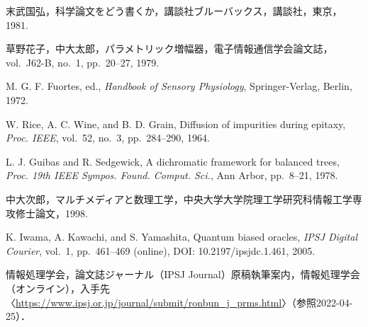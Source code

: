 \documentclass[10pt,a4paper,notitlepage,oneside,twocolumn]{abst_jsarticle}
\begin{document}
\begin{thebibliography}{99}

末武国弘，科学論文をどう書くか，講談社ブルーバックス，講談社，東京，1981. 

草野花子，中大太郎，パラメトリック増幅器，電子情報通信学会論文誌，vol.~J62-B, no.~1, pp.~20--27, 1979. 

M. G. F. Fuortes, ed., \textit{Handbook of Sensory Physiology}, Springer-Verlag, Berlin, 1972.

W. Rice, A. C. Wine, and B. D. Grain, Diffusion of impurities during epitaxy, \textit{Proc. IEEE}, vol.~52, no.~3, pp.~284--290, 1964.

L. J. Guibas and R. Sedgewick, A dichromatic framework for balanced trees, 
\textit{Proc. 19th IEEE Sympos. Found. Comput. Sci.}, Ann Arbor, pp.~8--21, 1978.

中大次郎，マルチメディアと数理工学，中央大学大学院理工学研究科情報工学専攻修士論文，1998.

K. Iwama, A. Kawachi, and S. Yamashita, Quantum biased oracles, \textit{IPSJ Digital Courier}, vol.~1, pp.~461--469 (online), DOI: 10.2197/ipsjdc.1.461, 2005.

情報処理学会，論文誌ジャーナル（IPSJ Journal）原稿執筆案内，情報処理学会（オンライン），入手先〈\url{https://www.ipsj.or.jp/journal/submit/ronbun_j_prms.html}〉（参照2022-04-25）．



\end{thebibliography}
\end{document}
